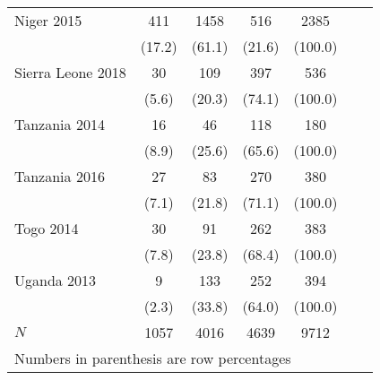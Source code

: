 \begin{tabular}{l*{6}{c}}
Niger 2015&                    {411}&                {1458}&          {516}&             {2385}\\
&                                              {(17.2)}&      {(61.1)}&        {(21.6)}&           {(100.0)}\\
Sierra Leone 2018&             {30}&                {109}&          {397}&             {536}\\
&                                              {(5.6)}&      {(20.3)}&        {(74.1)}&           {(100.0)}\\
Tanzania 2014&                 {16}&               {46}&          {118}&             {180}\\
&                                              {(8.9)}&     {(25.6)}&        {(65.6)}&           {(100.0)}\\
Tanzania 2016&                 {27}&               {83}&          {270}&              {380}\\
&                                              {(7.1)}&     {(21.8)}&        {(71.1)}&           {(100.0)}\\
Togo 2014&                             {30}&               {91}&          {262}&              {383}\\
&                                              {(7.8)}&     {(23.8)}&        {(68.4)}&           {(100.0)}\\
Uganda 2013&                   {9}&               {133}&          {252}&              {394}\\
&                                              {(2.3)}&     {(33.8)}&        {(64.0)}&          {(100.0)}\\
\hline
\(N\)                          &       {1057}        &  {4016}     &    {4639} &            {9712}\\
\hline\hline
\multicolumn{6}{l}{\footnotesize Numbers in parenthesis are row percentages}\\
\end{tabular}